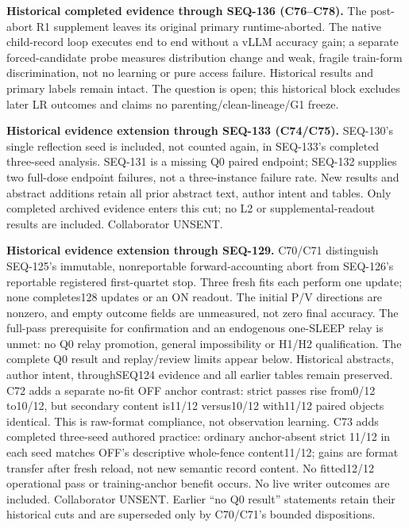 \documentclass[11pt]{article}
\begin{document}
\noindent\textbf{Historical completed evidence through SEQ-136 (C76--C78).}
The post-abort R1 supplement leaves its original primary runtime-aborted.
The native child-record loop executes end to end without a vLLM accuracy gain;
a separate forced-candidate probe measures distribution change and weak,
fragile train-form discrimination, not no learning or pure access failure.
Historical results and primary labels remain intact. The question is open;
this historical block excludes later LR outcomes and claims no parenting/clean-lineage/G1 freeze.

\noindent\textbf{Historical evidence extension through SEQ-133 (C74/C75).}
SEQ-130's single reflection seed is included, not counted again, in SEQ-133's
completed three-seed analysis. SEQ-131 is a missing Q0 paired endpoint;
SEQ-132 supplies two full-dose endpoint failures, not a three-instance failure
rate. New results and abstract additions retain all prior abstract text,
author intent and tables. Only completed archived evidence enters this cut;
no L2 or supplemental-readout results are included. Collaborator UNSENT.

\noindent\textbf{Historical evidence extension through SEQ-129.} C70/C71 distinguish
SEQ-125's immutable, nonreportable forward-accounting abort from SEQ-126's
reportable registered first-quartet stop. Three fresh fits each perform one
update; none completes128 updates or an ON readout. The initial P/V directions
are nonzero, and empty outcome fields are unmeasured, not zero final accuracy.
The full-pass prerequisite for confirmation and an endogenous one-SLEEP relay
is unmet: no Q0 relay promotion, general impossibility or H1/H2 qualification.
The complete Q0 result and replay/review limits appear below. Historical
abstracts, author intent, throughSEQ124 evidence and all earlier tables remain
preserved. C72 adds a separate no-fit OFF anchor contrast: strict passes rise
from0/12 to10/12, but secondary content is11/12 versus10/12 with11/12 paired
objects identical. This is raw-format compliance, not observation learning.
C73 adds completed three-seed authored practice: ordinary anchor-absent strict
11/12 in each seed matches OFF's descriptive whole-fence content11/12; gains
are format transfer after fresh reload, not new semantic record content. No
fitted12/12 operational pass or training-anchor benefit occurs. No live writer
outcomes are included. Collaborator UNSENT. Earlier ``no Q0 result'' statements retain their
historical cuts and are superseded only by C70/C71's bounded dispositions.
\end{document}
